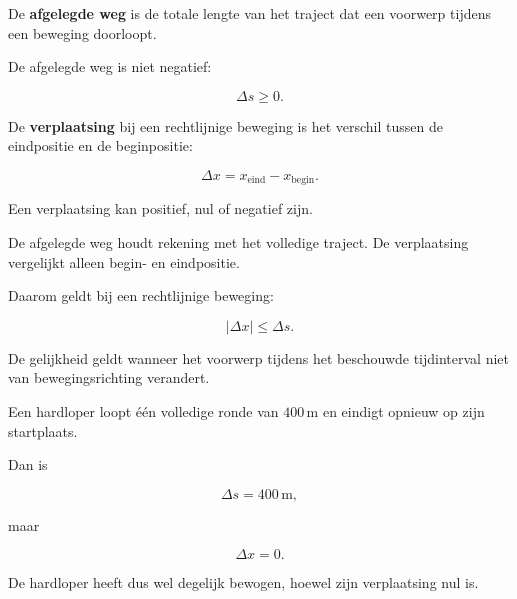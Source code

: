 \documentclass{ximera}
\begin{document}
\begin{definitie}

De \textbf{afgelegde weg} is de totale lengte van het traject dat
een voorwerp tijdens een beweging doorloopt.

\end{definitie}

De afgelegde weg is niet negatief:

\[
\boxed{\Delta s\geq0}.
\]


\begin{definitie}[Verplaatsing]

De \textbf{verplaatsing} bij een rechtlijnige beweging is het
verschil tussen de eindpositie en de beginpositie:

\[
\boxed{
\Delta x=x_{\mathrm{eind}}-x_{\mathrm{begin}}.
}
\]

\end{definitie}

Een verplaatsing kan positief, nul of negatief zijn.


De afgelegde weg houdt rekening met het volledige traject.
De verplaatsing vergelijkt alleen begin- en eindpositie.

Daarom geldt bij een rechtlijnige beweging:

\[
\boxed{
|\Delta x|\leq\Delta s.
}
\]

De gelijkheid geldt wanneer het voorwerp tijdens het beschouwde
tijdinterval niet van bewegingsrichting verandert.

\begin{voorbeeld}

Een hardloper loopt één volledige ronde van $400\,\mathrm{m}$ en
eindigt opnieuw op zijn startplaats.

Dan is

\[
\Delta s=400\,\mathrm{m},
\]

maar

\[
\Delta x=0.
\]

De hardloper heeft dus wel degelijk bewogen, hoewel zijn verplaatsing
nul is.

\end{voorbeeld}


\end{document}
